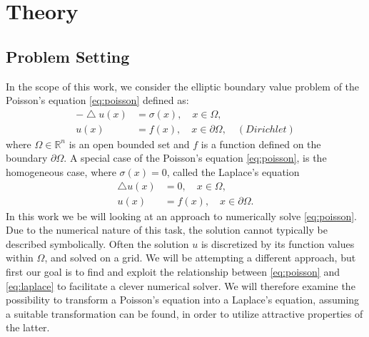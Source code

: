 \chapter{Theory}
\label{chapter:Theory}
%

\section{Problem Setting}
In the scope of this work, we consider the elliptic boundary value problem of
the Poisson's equation
\eqref{eq:poisson} defined as:
  \begin{equation}
    \begin{aligned}
  - \bigtriangleup u(x) &= \sigma(x),\quad x \in \Omega,
  \label{eq:poisson}
  \\ u(x) &= f(x),\quad x \in \partial \Omega, \quad (Dirichlet)
\end{aligned}
\end{equation}
where $\Omega \in \mathbb{R}^{n}$ is an open bounded set and $f$ is a function
defined on the boundary $\partial \Omega$.
A special case of the Poisson's equation \eqref{eq:poisson}, is the homogeneous
case, where $\sigma(x) = 0$, called the Laplace's equation
  \begin{equation}
    \begin{aligned}
    \bigtriangleup u(x) &= 0,\quad x \in \Omega,
  \\ u(x) &= f(x),\quad x \in \partial \Omega\text{.}
    \label{eq:laplace}
  \end{aligned}
  \end{equation}
In this work we be will looking at an approach to numerically solve \eqref{eq:poisson}.
Due to the numerical nature of this task, the solution cannot typically be described symbolically.
Often the solution $u$ is discretized by its function values within $\Omega$, and solved on a grid.
We will be attempting a different approach, but first our goal is to find and exploit the relationship
between \eqref{eq:poisson} and \eqref{eq:laplace} to facilitate a clever numerical solver.
We will therefore examine the possibility to transform a Poisson's equation into
a Laplace's equation, assuming a suitable transformation can be found, in order to
utilize attractive properties of the latter.

